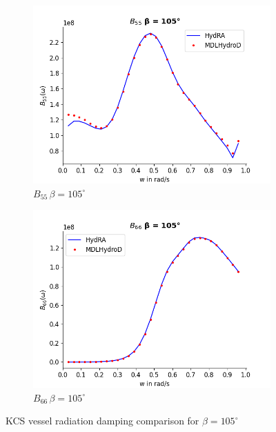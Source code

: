 \begin{figure}[H]
\begin{subfigure}[b]{0.49\textwidth}
        \includegraphics[width=\textwidth]{plots/kcs/rad_damp/b55.png}
        \caption{$B_{55} \, \beta = 105^{\circ}$}
    \end{subfigure}
    \begin{subfigure}[b]{0.49\textwidth}
        \includegraphics[width=\textwidth]{plots/kcs/rad_damp/b66.png}
        \caption{$B_{66} \, \beta = 105^{\circ}$}
    \end{subfigure}
    \caption{KCS vessel radiation damping comparison for $\beta= 105^{\circ}$}
    \label{fig:radition_damp_125}
\end{figure}

